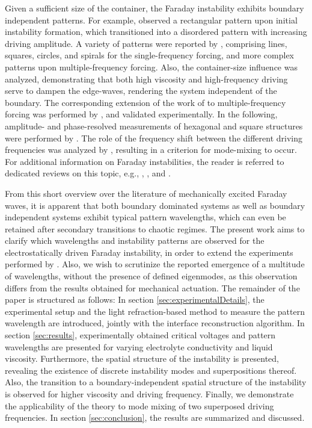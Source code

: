 \documentclass{jfm_arxiv}
\begin{document}
Given a sufficient size of the container, the Faraday instability exhibits boundary independent patterns. For example, \citet{Tufillaro1989} observed a rectangular pattern upon initial instability formation, which transitioned into a disordered pattern with increasing driving amplitude. 
A variety of patterns were reported by \citet{Edwards1994}, comprising lines, squares, circles, and spirals for the single-frequency forcing, and more complex patterns upon multiple-frequency forcing. Also, the container-size influence was analyzed, demonstrating that both high viscosity and high-frequency driving serve to dampen the edge-waves, rendering the system independent of the boundary.
The corresponding extension of the work of \citet{Kumar1994} to multiple-frequency forcing was performed by \citet{Besson1996}, and validated experimentally. 
In the following, amplitude- and phase-resolved measurements of hexagonal and square structures were performed by \citet{Kityk2005}. 
The role of the frequency shift between the different driving frequencies was analyzed by \citet{Epstein2008}, resulting in a criterion for mode-mixing to occur. 
For additional information on Faraday instabilities, the reader is referred to dedicated reviews on this topic, e.g., \citet{Nevolin1984}, \citet{Miles1990}, \citet{Perlin2000} and \citet{Muller2011}. 

From this short overview over the literature of mechanically excited Faraday waves, it is apparent that both boundary dominated systems as well as boundary independent systems exhibit typical pattern wavelengths, which can even be retained after secondary transitions to chaotic regimes. 
The present work aims to clarify which wavelengths and instability patterns are observed for the electrostatically driven Faraday instability, in order to extend the experiments performed by \citet{Ward2019}. 
Also, we wish to scrutinize the reported emergence of a multitude of wavelengths, without the presence of defined eigenmodes, as this observation differs from the results obtained for mechanical actuation.
The remainder of the paper is structured as follows: 
In section \ref{sec:experimentalDetails}, the experimental setup and the light refraction-based method to measure the pattern wavelength are introduced, jointly with the interface reconstruction algorithm. In section \ref{sec:results}, experimentally obtained critical voltages and pattern wavelengths are presented for varying electrolyte conductivity and liquid viscosity. Furthermore, the spatial structure of the instability is presented, revealing the existence of discrete instability modes and superpositions thereof. Also, the transition to a boundary-independent spatial structure of the instability is observed for higher viscosity and driving frequency.
Finally, we demonstrate the applicability of the theory to mode mixing of two superposed driving frequencies. In section \ref{sec:conclusion}, the results are summarized and discussed. 
\end{document}
